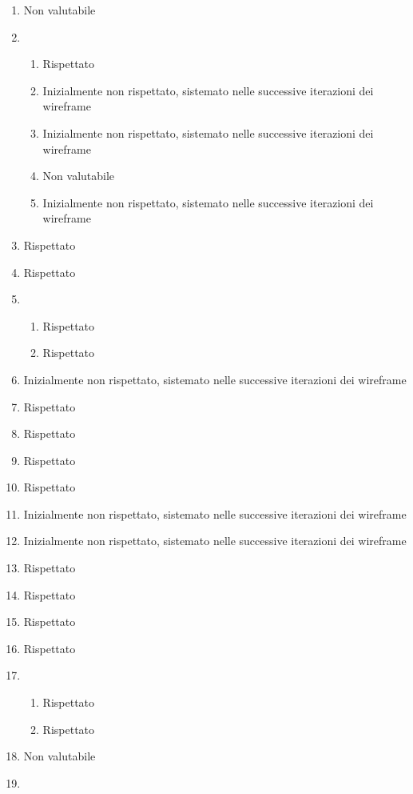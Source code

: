 \begin{enumerate}
    \item Non valutabile
    \item \begin{enumerate}[label=\Alph*]
        \item Rispettato
        \item Inizialmente non rispettato, sistemato nelle successive iterazioni dei wireframe
        \item Inizialmente non rispettato, sistemato nelle successive iterazioni dei wireframe
        \item Non valutabile
        \item Inizialmente non rispettato, sistemato nelle successive iterazioni dei wireframe
    \end{enumerate}
    \item Rispettato
    \item Rispettato
    \item \begin{enumerate}[label=\Alph*]
        \item Rispettato
        \item Rispettato
    \end{enumerate}
    \item Inizialmente non rispettato, sistemato nelle successive iterazioni dei wireframe
    \item Rispettato
    \item Rispettato
    \item Rispettato
    \item Rispettato
    \item Inizialmente non rispettato, sistemato nelle successive iterazioni dei wireframe
    \item Inizialmente non rispettato, sistemato nelle successive iterazioni dei wireframe
    \item Rispettato
    \item Rispettato
    \item Rispettato
    \item Rispettato
    \item \begin{enumerate}[label=\Alph*]
        \item Rispettato
        \item Rispettato
    \end{enumerate}
    \item Non valutabile
    \item \begin{enumerate}[label=\Alph*]

\end{enumerate}
\end{enumerate}
